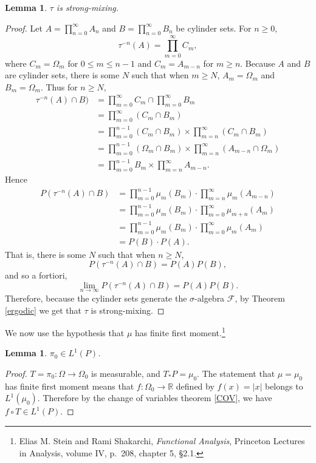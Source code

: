 \documentclass{article}
\newtheorem{lemma}[theorem]{Lemma}
\theoremstyle{definition}
\begin{document}
\begin{lemma}
$\tau$ is strong-mixing.
\end{lemma}
\begin{proof}
Let $A=\prod_{n=0}^\infty A_n$ and $B=\prod_{n=0}^\infty B_n$ be cylinder sets.
For $n \geq 0$,
\[
\tau^{-n}(A) = \prod_{m=0}^\infty C_m,
\]
where $C_m=\Omega_m$ for $0 \leq m \leq n-1$ and 
$C_m=A_{m-n}$ for $m \geq n$. Because $A$ and $B$ are cylinder sets, there is some $N$ such that when
$m \geq N$, $A_m = \Omega_m$ and $B_m=\Omega_m$. Thus for $n \geq N$,
\begin{align*}
\tau^{-n}(A) \cap B) &= \prod_{m=0}^\infty C_m \cap \prod_{m=0}^\infty B_m\\
&=\prod_{m=0}^\infty (C_m \cap B_m)\\
&= \prod_{m=0}^{n-1} (C_m \cap B_m) \times \prod_{m=n}^\infty (C_m \cap B_m)\\
&=\prod_{m=0}^{n-1} (\Omega_m \cap B_m) \times \prod_{m=n}^\infty (A_{m-n} \cap \Omega_m)\\
&=\prod_{m=0}^{n-1} B_m \times \prod_{m=n}^\infty A_{m-n}.
\end{align*}
Hence
\begin{align*}
P(\tau^{-n}(A) \cap B) &= \prod_{m=0}^{n-1} \mu_m(B_m) \cdot \prod_{m=n}^\infty \mu_m(A_{m-n})\\
&=\prod_{m=0}^{n-1} \mu_m(B_m) \cdot \prod_{m=0}^\infty \mu_{m+n}(A_m)\\
&=\prod_{m=0}^{n-1} \mu_m(B_m) \cdot \prod_{m=0}^\infty \mu_m(A_m)\\
&=P(B) \cdot P(A).
\end{align*}
That is, there is some $N$ such that when $n \geq N$,
\[
P(\tau^{-n}(A) \cap B)  = P(A) P(B),
\]
and  so a fortiori,
\[
\lim_{n \to \infty} P(\tau^{-n}(A) \cap B) = P(A) P(B).
\]
Therefore, because the cylinder sets generate the $\sigma$-algebra $\mathscr{F}$, by Theorem \ref{ergodic}
we get that $\tau$ is strong-mixing.
\end{proof}



We now use the hypothesis that $\mu$ has finite first moment.\footnote{Elias M. Stein and Rami Shakarchi,
{\em Functional Analysis}, Princeton Lectures in Analysis, volume IV, p.~208, chapter 5, \S 2.1.}

\begin{lemma}
$\pi_0 \in L^1(P)$.
\end{lemma}
\begin{proof}
$T=\pi_0:\Omega \to \Omega_0$ is measurable,
and $T_*P=\mu_0$. 
The statement that $\mu=\mu_0$ has finite first moment means that
$f:\Omega_0 \to \mathbb{R}$ defined by
$f(x)=|x|$ belongs to $L^1(\mu_0)$. 
Therefore by the change of variables theorem \eqref{COV},
we have $f \circ T \in L^1(P)$. 
\end{proof}
\end{document}
